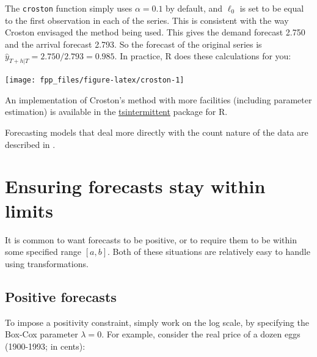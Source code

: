 \documentclass[]{book}
\newenvironment{Shaded}{\begin{snugshade}}{\end{snugshade}}
\newcommand{\DataTypeTok}[1]{\textcolor[rgb]{0.13,0.29,0.53}{#1}}
\newcommand{\DecValTok}[1]{\textcolor[rgb]{0.00,0.00,0.81}{#1}}
\newcommand{\KeywordTok}[1]{\textcolor[rgb]{0.13,0.29,0.53}{\textbf{#1}}}
\newcommand{\NormalTok}[1]{#1}
\newcommand{\OperatorTok}[1]{\textcolor[rgb]{0.81,0.36,0.00}{\textbf{#1}}}
\newcommand{\OtherTok}[1]{\textcolor[rgb]{0.56,0.35,0.01}{#1}}
\newcommand{\StringTok}[1]{\textcolor[rgb]{0.31,0.60,0.02}{#1}}
\begin{document}
The \texttt{croston} function simply uses \(\alpha=0.1\) by default, and \(\ell_0\) is set to be equal to the first observation in each of the series. This is consistent with the way Croston envisaged the method being used. This gives the demand forecast 2.750 and the arrival forecast 2.793. So the forecast of the original series is
\(\hat{y}_{T+h|T} = 2.750 / 2.793 = 0.985\). In practice, R does these calculations for you:

\begin{Shaded}
\end{Shaded}

\begin{center}\texttt{[image: fpp\_files/figure-latex/croston-1]} \end{center}

An implementation of Croston's method with more facilities (including parameter estimation) is available in the \href{https://cran.r-project.org/package=tsintermittent}{tsintermittent} package for R.

Forecasting models that deal more directly with the count nature of the data are described in \citet{christou2015count}.

\hypertarget{limits}{%
\section{Ensuring forecasts stay within limits}\label{limits}}

It is common to want forecasts to be positive, or to require them to be within some specified range \([a,b]\). Both of these situations are relatively easy to handle using transformations.

\hypertarget{positive-forecasts}{%
\subsection*{Positive forecasts}\label{positive-forecasts}}

To impose a positivity constraint, simply work on the log scale, by specifying the Box-Cox parameter \(\lambda=0\). For example, consider the real price of a dozen eggs (1900-1993; in cents):

\begin{Shaded}
\end{Shaded}
\end{document}

